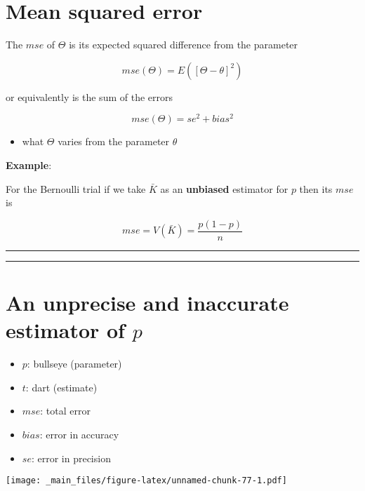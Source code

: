 \documentclass[
]{book}
\providecommand{\tightlist}{%
  \setlength{\itemsep}{0pt}\setlength{\parskip}{0pt}}
\begin{document}
\hypertarget{mean-squared-error}{%
\section{Mean squared error}\label{mean-squared-error}}

The \(mse\) of \(\Theta\) is its expected squared difference from the parameter

\[mse(\Theta)=E([\Theta - \theta]^2)\]

or equivalently is the sum of the errors

\[mse(\Theta)=se^2 + bias^2\]

\begin{itemize}
\tightlist
\item
  what \(\Theta\) varies from the parameter \(\theta\)
\end{itemize}

\textbf{Example}:

For the Bernoulli trial if we take \(\bar{K}\) as an \textbf{unbiased} estimator for \(p\) then its \(mse\) is

\[mse=V(\bar{K})=\frac{p(1-p)}{n}\]

\begin{center}\rule{0.5\linewidth}{0.5pt}\end{center}

\begin{center}\rule{0.5\linewidth}{0.5pt}\end{center}

\hypertarget{an-unprecise-and-inaccurate-estimator-of-p}{%
\section{\texorpdfstring{An unprecise and inaccurate estimator of \(p\)}{An unprecise and inaccurate estimator of p}}\label{an-unprecise-and-inaccurate-estimator-of-p}}

\begin{itemize}
\tightlist
\item
  \(p\): bullseye (parameter)
\item
  \(t\): dart (estimate)
\item
  \(mse\): total error
\item
  \(bias\): error in accuracy
\item
  \(se\): error in precision
\end{itemize}

\texttt{[image: \_main\_files/figure-latex/unnamed-chunk-77-1.pdf]}
\end{document}
